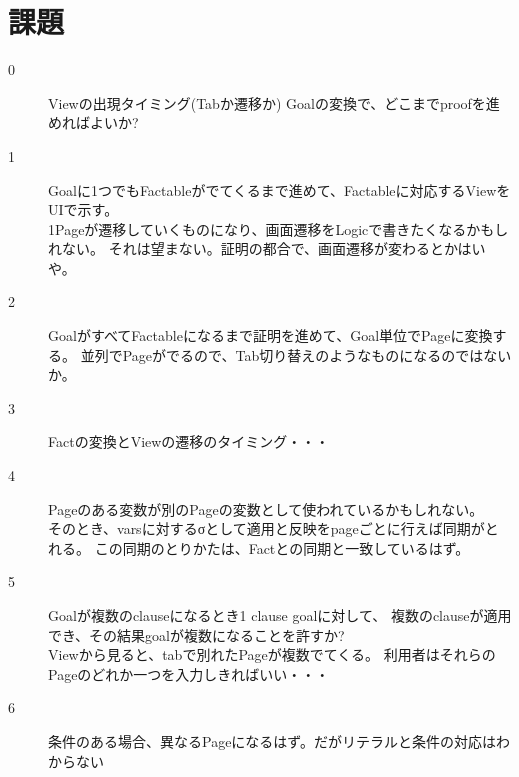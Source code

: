 \documentclass[10pt, onecolumn]{jarticle}   	%
\begin{document}
\section{課題}
\begin{description}
\item[0]Viewの出現タイミング(Tabか遷移か)
Goalの変換で、どこまでproofを進めればよいか?
\item[1]Goalに1つでもFactableがでてくるまで進めて、Factableに対応するViewをUIで示す。\\
1Pageが遷移していくものになり、画面遷移をLogicで書きたくなるかもしれない。
それは望まない。証明の都合で、画面遷移が変わるとかはいや。
\item[2]GoalがすべてFactableになるまで証明を進めて、Goal単位でPageに変換する。
並列でPageがでるので、Tab切り替えのようなものになるのではないか。
\item[3]Factの変換とViewの遷移のタイミング・・・
\item[4]Pageのある変数が別のPageの変数として使われているかもしれない。\\
そのとき、varsに対するσとして適用と反映をpageごとに行えば同期がとれる。
この同期のとりかたは、Factとの同期と一致しているはず。
\item[5]Goalが複数のclauseになるとき1 clause goalに対して、
複数のclauseが適用でき、その結果goalが複数になることを許すか?\\
Viewから見ると、tabで別れたPageが複数でてくる。
利用者はそれらのPageのどれか一つを入力しきればいい・・・
\item[6]条件のある場合、異なるPageになるはず。だがリテラルと条件の対応はわからない

\end{description}
\end{document}
